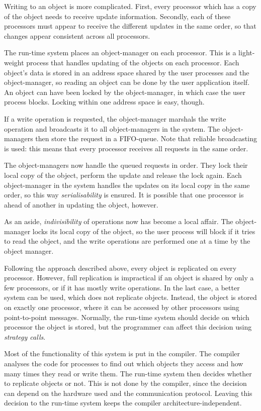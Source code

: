 Writing to an object is more complicated. First, every processor
which has a copy of the object needs to receive update information.
Secondly, each of these processors must appear to receive the different updates
in the same order, so that changes appear consistent across all
processors.

The run-time system places an object-manager on each processor. This
is a light-weight process that handles updating of the
objects on each processor. Each object's data is stored in an address space
shared by the user processes and the object-manager, so reading an object
can be done by the user application itself. An object can have been locked
by the object-manager, in which case the user process blocks. Locking
within one address space is easy, though.

If a write operation is requested, the object-manager marshals
the write operation and broadcasts it to all object-managers in the
system. The
object-managers then store the request in a FIFO-queue. Note that
reliable broadcasting is used: this means that every processor receives
all requests in the same order.

The object-managers now handle the queued requests in order. They
lock their local copy of the object, perform the update and release the
lock again. Each object-manager in the system handles the updates on its
local copy in the same order, so this way {\em serialisability} is
ensured. It is possible that one processor is ahead of another in updating
the object, however.

As an aside, {\em indivisibility} of operations now has become a local
affair. The object-manager locks its local copy of the object, so the
user process will block if it tries to read the object, and the write
operations are performed one at a time by the object manager.

Following the approach described above, every object is replicated on
every processor. However, full replication is impractical if an object
is shared by only a few processors, or if it has mostly write
operations. In the last case, a better system can be used, which does
not replicate objects.  Instead, the object is
stored on exactly one processor, where it can be accessed by other
processors using point-to-point messages.
Normally, the run-time system should decide on
which processor the object is stored, but the programmer can affect
this decision using {\em strategy calls}.

Most of the functionality of this system is put in the compiler. The
compiler analyses the code for processes to find out which objects
they access and how many times they read or write them. The run-time
system then decides whether to replicate objects or not. This is not 
done by the compiler, since the decision can depend on the hardware used
and the communication protocol. Leaving this decision to the run-time
system keeps the compiler architecture-independent.

